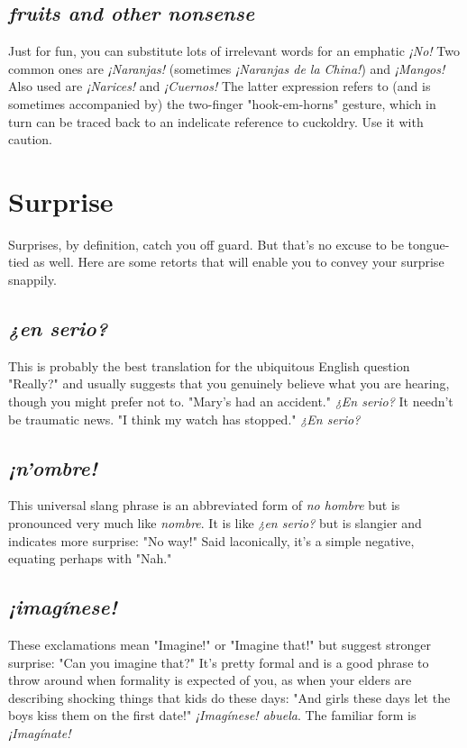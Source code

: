 \subsection{\emph{fruits and other nonsense}}

Just for fun, you can substitute lots of irrelevant words for an
emphatic \emph{¡No!} Two common ones are \emph{¡Naranjas!} (sometimes \emph{¡Naranjas de la China!}) and \emph{¡Mangos!} Also used are \emph{¡Narices!} and \emph{¡Cuernos!}
The latter expression refers to (and is sometimes accompanied by) the
two-finger "hook-em-horns" gesture, which in turn can be traced back
to an indelicate reference to cuckoldry. Use it with caution.

\section{Surprise}

Surprises, by definition, catch you off guard. But that's no excuse to be tongue-tied as well. Here are some retorts that will enable
you to convey your surprise snappily.

\subsection{\emph{¿en serio?}}

This is probably the best translation for the ubiquitous English
question "Really?" and usually suggests that you genuinely believe
what you are hearing, though you might prefer not to. "Mary's had an
accident." \emph{¿En serio?} It needn't be traumatic news. "I think my watch
has stopped." \emph{¿En serio?}

\subsection{\emph{¡n'ombre!}}

This universal slang phrase is an abbreviated form of \emph{no hombre} but is pronounced very much like \emph{nombre}. It is like \emph{¿en serio?} but
is slangier and indicates more surprise: "No way!" Said laconically, it's
a simple negative, equating perhaps with "Nah."

\subsection{\emph{¡imagínese!}}

These exclamations mean "Imagine!" or "Imagine that!" but
suggest stronger surprise: "Can you imagine that?" It's pretty formal
and is a good phrase to throw around when formality is expected of
you, as when your elders are describing shocking things that kids do
these days: "And girls these days let the boys kiss them on the first
date!" \emph{¡Imagínese! abuela}. The familiar form is \emph{¡Imagínate!}

